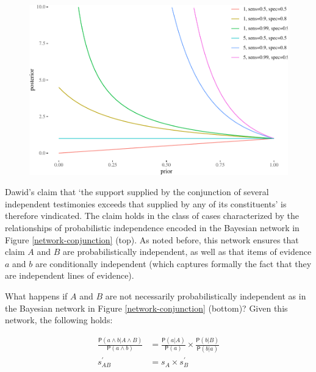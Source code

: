 \documentclass[10pt,dvipsnames,enabledeprecatedfontcommands]{scrartcl}
\newcommand{\pr}[1]{\mathsf{P}(#1)}
\begin{document}

\begin{figure}


\begin{center}\includegraphics[width=0.9\linewidth]{conjunction-paradox_files/figure-latex/unnamed-chunk-5-1} \end{center}

\end{figure}

Dawid's claim that `the support supplied by the conjunction of several
independent testimonies exceeds that supplied by any of its
constituents' is therefore vindicated. The claim holds in the class of
cases characterized by the relationships of probabilistic independence
encoded in the Bayesian network in Figure \ref{network-conjunction}
(top). As noted before, this network ensures that claim \(A\) and \(B\)
are probabilistically independent, as well as that items of evidence
\(a\) and \(b\) are conditionally independent (which captures formally
the fact that they are independent lines of evidence).

What happens if \(A\) and \(B\) are not necessarily probabilistically
independent as in the Bayesian network in Figure
\ref{network-conjunction} (bottom)? Given this network, the following
holds:

\begin{align*}
\frac{\pr{a \wedge b| A\wedge B}}{\pr{a \wedge b}} & =  \frac{\pr{a |A}}{\pr{a}} \times \frac{\pr{b |B}}{\pr{b|a}} \\
s^{'}_{AB}& =  s_{A}\times s^{'}_{B} 
 \end{align*}
\end{document}
